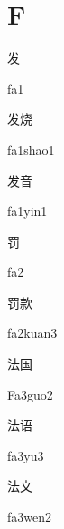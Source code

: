 ﻿%
\section*{F}
\begin{multicols*}{2}

\begin{verbete}[fa1]{发}
\begin{pronuncia}{fa1}
\end{pronuncia}
\end{verbete}

\begin{verbete}[fa1shao1]{发烧}
\begin{pronuncia}{fa1shao1}
\end{pronuncia}
\end{verbete}

\begin{verbete}[fa1yin1]{发音}
\begin{pronuncia}{fa1yin1}
\end{pronuncia}
\end{verbete}

\begin{verbete}[fa2]{罚}
\begin{pronuncia}{fa2}
\end{pronuncia}
\end{verbete}

\begin{verbete}[fa2kuan3]{罚款}
\begin{pronuncia}{fa2kuan3}
\end{pronuncia}
\end{verbete}

\begin{verbete}[Fa3guo2]{法国}
\begin{pronuncia}{Fa3guo2}
\end{pronuncia}
\end{verbete}

\begin{verbete}[fa3yu3]{法语}
\begin{pronuncia}{fa3yu3}
\end{pronuncia}
\end{verbete}

\begin{verbete}[fa3wen2]{法文}
\begin{pronuncia}{fa3wen2}
\end{pronuncia}
\end{verbete}


\end{multicols*}
